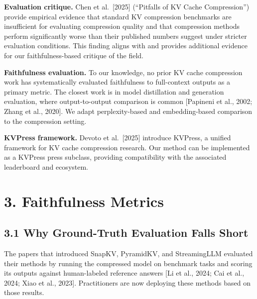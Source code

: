 \documentclass[10pt,letterpaper]{article}
\begin{document}
\textbf{Evaluation critique.} Chen et al.~{[}2025{]} (``Pitfalls of KV
Cache Compression'') provide empirical evidence that standard KV
compression benchmarks are insufficient for evaluating compression
quality and that compression methods perform significantly worse than
their published numbers suggest under stricter evaluation conditions.
This finding aligns with and provides additional evidence for our
faithfulness-based critique of the field.

\textbf{Faithfulness evaluation.} To our knowledge, no prior KV cache
compression work has systematically evaluated faithfulness to
full-context outputs as a primary metric. The closest work is in model
distillation and generation evaluation, where output-to-output
comparison is common {[}Papineni et al., 2002; Zhang et al., 2020{]}. We
adapt perplexity-based and embedding-based comparison to the compression
setting.

\textbf{KVPress framework.} Devoto et al.~{[}2025{]} introduce KVPress,
a unified framework for KV cache compression research. Our method can be
implemented as a KVPress press subclass, providing compatibility with
the associated leaderboard and ecosystem.

\hypertarget{faithfulness-metrics}{%
\section{3. Faithfulness Metrics}\label{faithfulness-metrics}}

\hypertarget{why-ground-truth-evaluation-falls-short}{%
\subsection{3.1 Why Ground-Truth Evaluation Falls
Short}\label{why-ground-truth-evaluation-falls-short}}

The papers that introduced SnapKV, PyramidKV, and StreamingLLM evaluated
their methods by running the compressed model on benchmark tasks and
scoring its outputs against human-labeled reference answers
{[}Li et al., 2024; Cai et al., 2024; Xiao et al., 2023{]}.
Practitioners are now deploying these methods based on those results.
\end{document}
